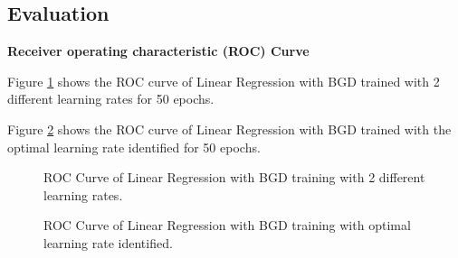 \documentclass{article} %
\begin{document}
\subsection{Evaluation}

\textbf{Receiver operating characteristic (ROC) Curve}

Figure \ref{Fig5} shows the ROC curve of Linear Regression with BGD trained with 2 different learning rates for 50 epochs.

Figure \ref{Fig6} shows the ROC curve of Linear Regression with BGD trained with the optimal learning rate identified for 50 epochs.

\begin{figure}[!htbp]
\begin{center}
\end{center}
\caption{ROC Curve of Linear Regression with BGD training with 2 different learning rates.}
\label{Fig5}
\end{figure}

\begin{figure}[!htbp]
\begin{center}
\end{center}
\caption{ROC Curve of Linear Regression with BGD training with optimal learning rate identified.}
\label{Fig6}
\end{figure}
\end{document}
